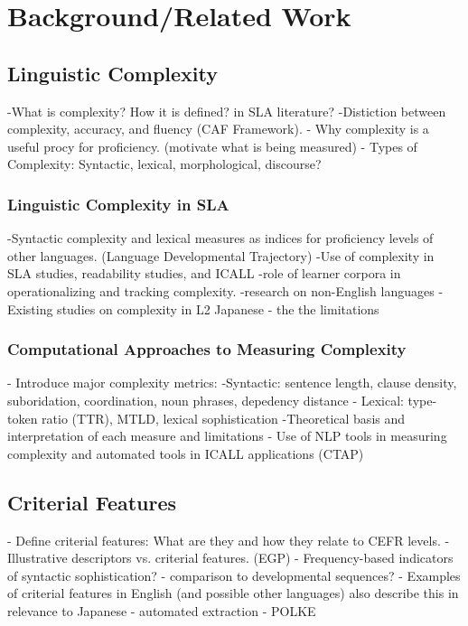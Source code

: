 \chapter{Background/Related Work}

\section{Linguistic Complexity}
-What is complexity? How it is defined? in SLA literature?
-Distiction between complexity, accuracy, and fluency (CAF Framework).
- Why complexity is a useful procy for proficiency. (motivate what is being measured)
- Types of Complexity: Syntactic, lexical, morphological, discourse?


\subsection{Linguistic Complexity in SLA}
-Syntactic complexity and lexical measures as indices for proficiency levels of other languages. (Language Developmental Trajectory)
-Use of complexity in SLA studies, readability studies, and ICALL
-role of learner corpora in operationalizing and tracking complexity.
-research on non-English languages
-Existing studies on complexity in L2 Japanese - the the limitations


\subsection{Computational Approaches to Measuring Complexity}
- Introduce major complexity metrics:
    -Syntactic: sentence length, clause density, suboridation, coordination, noun phrases, depedency distance
    - Lexical: type-token ratio (TTR), MTLD, lexical sophistication
-Theoretical basis and interpretation of each measure and limitations
- Use of NLP tools in measuring complexity and automated tools in ICALL applications (CTAP)

\section{Criterial Features}
- Define criterial features: What are they and how they relate to CEFR levels.
- Illustrative descriptors vs. criterial features. (EGP)
- Frequency-based indicators of syntactic sophistication? \cite{Ellis2004}
    - comparison to developmental sequences?
- Examples of criterial features in English (and possible other languages) also describe this in relevance to Japanese
- automated extraction - POLKE


